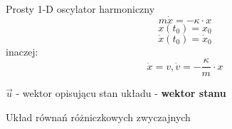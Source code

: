 \begin{frame}{Prosty 1-D oscylator harmoniczny}
  $$m\dot x = -\kappa \cdot x$$
  $$ x(t_0)=x_0$$
  $$\dot x(t_0) = \dot x_0$$
  inaczej:
  $$\dot x = v, \dot v = - \frac{\kappa}{m} \cdot x$$

  $\vec{u}$ - wektor opisującu stan układu - \textbf{wektor stanu} \par
  Układ równań różniczkowych zwyczajnych
\end{frame}
